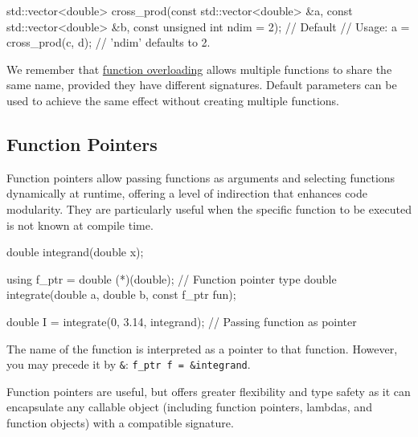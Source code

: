 \vspace{-0.5em}

\begin{codeblock}[language=C++, numbers=none]
std::vector<double> cross_prod(const std::vector<double> &a,
                               const std::vector<double> &b,
                               const unsigned int ndim = 2); // Default
// Usage:
a = cross_prod(c, d); // 'ndim' defaults to 2.
\end{codeblock}

\begin{observationblock}
    We remember that \hyperref[function-overloading]{function overloading} allows multiple functions to share the same name, provided they have different signatures. Default parameters can be used to achieve the same effect without creating multiple functions.
\end{observationblock}

\subsection{Function Pointers}

\vspace{-0.5em}

Function pointers allow passing functions as arguments and selecting functions dynamically at runtime, offering a level of indirection that enhances code modularity. They are particularly useful when the specific function to be executed is not known at compile time.

\vspace{-0.5em}

\begin{codeblock}[language=C++, numbers=none]
double integrand(double x);

using f_ptr = double (*)(double); // Function pointer type
double integrate(double a, double b, const f_ptr fun);

double I = integrate(0, 3.14, integrand); // Passing function as pointer
\end{codeblock}

\vspace{-0.5em}

The name of the function is interpreted as a pointer to that function. However, you may precede it by \texttt{\&}: \texttt{f\_ptr f = \&integrand}.

Function pointers are useful, but  offers greater flexibility and type safety as it can encapsulate any callable object (including function pointers, lambdas, and function objects) with a compatible signature.

